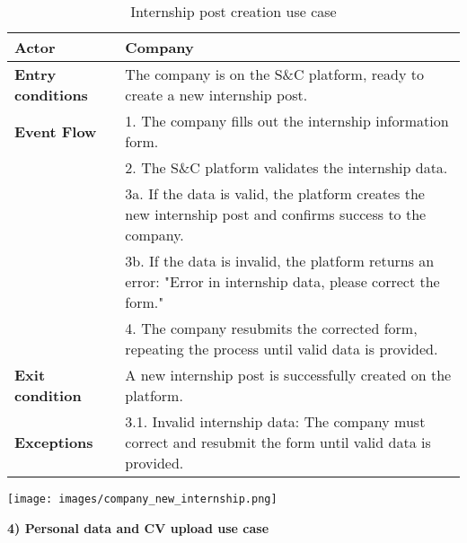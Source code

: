 \begin{table}[h!]
    \centering
    \begin{tabular}{lp{10cm}}
        \textbf{Actor} & Company \\ \hline
        \textbf{Entry conditions} & The company is on the S\&C platform, ready to create a new internship post. \\ \hline
        \textbf{Event Flow} & 
        1. The company fills out the internship information form. \\
        & 2. The S\&C platform validates the internship data. \\
        & 3a. If the data is valid, the platform creates the new internship post and confirms success to the company. \\
        & 3b. If the data is invalid, the platform returns an error: "Error in internship data, please correct the form." \\
        & 4. The company resubmits the corrected form, repeating the process until valid data is provided. \\
        \hline
        \textbf{Exit condition} & A new internship post is successfully created on the platform. \\ \hline
        \textbf{Exceptions} & 
        3.1. Invalid internship data: The company must correct and resubmit the form until valid data is provided. \\
    \end{tabular}
    \caption{Internship post creation use case}
    \label{tab:internship_post_creation}
\end{table}


\begin{center}
    \texttt{[image: images/company\_new\_internship.png]}
\end{center}

\newpage
\textbf{4) Personal data and CV upload use case}\\

